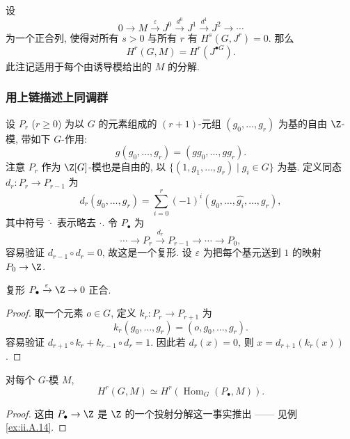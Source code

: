 \begin{remark}\label{rem:ii.1.14}
设
\[
 0\to M\xrightarrow{\varepsilon} J^0\xrightarrow{d^0} J^1\xrightarrow{d^1} J^2\to\cdots
\]
为一个正合列, 使得对所有 $s>0$ 与所有 $r$ 有 $H^s(G,J^r)=0$. 那么
\[
 H^r(G,M)=H^r(J^{\bullet G}).
\]
此注记适用于每个由诱导模给出的 $M$ 的分解.
\end{remark}

\subsubsection*{用上链描述上同调群}

设 $P_r$ ($r\ge 0$) 为以 $G$ 的元素组成的 $(r+1)$-元组 $(g_0,\ldots,g_r)$ 为基的自由 $\Z$-模, 带如下 $G$-作用:
\[
 g(g_0,\ldots,g_r)=(gg_0,\ldots,gg_r).
\]
注意 $P_r$ 作为 $\Z[G]$-模也是自由的, 以 $\{(1,g_1,\ldots,g_r)\mid g_i\in G\}$ 为基. 定义同态 $d_r\colon P_r\to P_{r-1}$ 为
\[
 d_r(g_0,\ldots,g_r)=\sum_{i=0}^r (-1)^i (g_0,\ldots,\widehat{g_i},\ldots,g_r),
\]
其中符号 $\hat{\cdot}$ 表示略去 $\cdot$. 令 $P_\bullet$ 为
\[
 \cdots\to P_r\xrightarrow{d_r} P_{r-1}\to\cdots\to P_0,
\]
容易验证 $d_{r-1}\circ d_r=0$, 故这是一个复形. 设 $\varepsilon$ 为把每个基元送到 $1$ 的映射 $P_0\to\Z$.

\begin{lemma}\label{lem:ii.1.15}
复形 $P_\bullet\xrightarrow{\varepsilon}\Z\to 0$ 正合.
\end{lemma}

\begin{proof}
取一个元素 $o\in G$, 定义 $k_r\colon P_r\to P_{r+1}$ 为
\[
 k_r(g_0,\ldots,g_r)=(o,g_0,\ldots,g_r).
\]
容易验证 $d_{r+1}\circ k_r+k_{r-1}\circ d_r=1$. 因此若 $d_r(x)=0$, 则 $x=d_{r+1}(k_r(x))$.
\end{proof}

\begin{proposition}\label{prop:ii.1.16}
对每个 $G$-模 $M$,
\[
 H^r(G,M)\simeq H^r(\operatorname{Hom}_G(P_\bullet,M)).
\]
\end{proposition}

\begin{proof}
这由 $P_\bullet\to\Z$ 是 $\Z$ 的一个投射分解这一事实推出 —— 见例 \ref{ex:ii.A.14}.
\end{proof}

